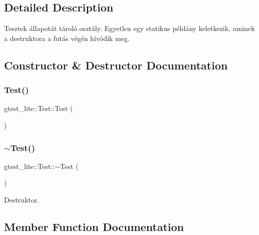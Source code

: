 \subsection{Detailed Description}
Tesztek állapotát tároló osztály. Egyetlen egy statikus példány keletkezik, aminek a destruktora a futás végén hívódik meg. 

\subsection{Constructor \& Destructor Documentation}
\mbox{\label{structgtest__lite_1_1_test_a99fb3f2338e4e0512beb6e19c5409078}} 
\subsubsection{\texorpdfstring{Test()}{Test()}}
{\footnotesize\ttfamily gtest\+\_\+lite\+::\+Test\+::\+Test (\begin{DoxyParamCaption}{ }\end{DoxyParamCaption})\hspace{0.3cm}{\ttfamily [inline]}}

\mbox{\label{structgtest__lite_1_1_test_a5a879233c2aa110626668c06140f6e71}} 
\subsubsection{\texorpdfstring{$\sim$\+Test()}{~Test()}}
{\footnotesize\ttfamily gtest\+\_\+lite\+::\+Test\+::$\sim$\+Test (\begin{DoxyParamCaption}{ }\end{DoxyParamCaption})\hspace{0.3cm}{\ttfamily [inline]}}



Destruktor. 



\subsection{Member Function Documentation}
\mbox{\label{structgtest__lite_1_1_test_a2227b70fcc5dfb3c326bf117dd8f7e79}} 
